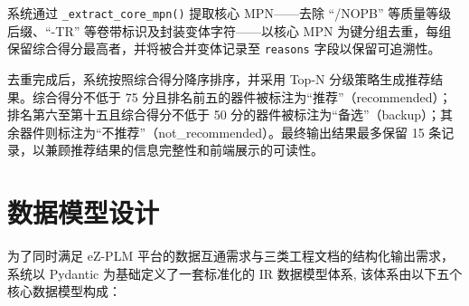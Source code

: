 系统通过 \texttt{\_extract\_core\_mpn()} 提取核心 MPN——去除 “/NOPB” 等质量等级后缀、“-TR” 等卷带标识及封装变体字符——以核心 MPN 为键分组去重，每组保留综合得分最高者，并将被合并变体记录至 \texttt{reasons} 字段以保留可追溯性。

去重完成后，系统按照综合得分降序排序，并采用 Top-N 分级策略生成推荐结果。综合得分不低于 75 分且排名前五的器件被标注为“推荐”（recommended）；排名第六至第十五且综合得分不低于 50 分的器件被标注为“备选”（backup）；其余器件则标注为“不推荐”（not\_recommended）。最终输出结果最多保留 15 条记录，以兼顾推荐结果的信息完整性和前端展示的可读性。
\section{数据模型设计}

为了同时满足 eZ-PLM 平台的数据互通需求与三类工程文档的结构化输出需求，系统以 Pydantic 为基础定义了一套标准化的 IR 数据模型体系, 该体系由以下五个核心数据模型构成：

